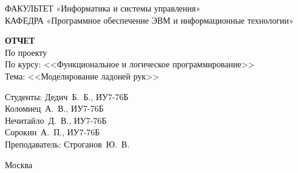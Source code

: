 \begin{titlepage}
	{\doublespacing \small \raggedright ФАКУЛЬТЕТ \hspace{25mm} «Информатика и системы управления»\\
	КАФЕДРА \hspace{5mm} «Программное обеспечение ЭВМ и информационные технологии»\\}

	\vspace{30mm}
	
	\textbf{ОТЧЕТ}\\
	По проекту\\
	По курсу: <<Функциональное и логическое программирование>>\\
	Тема: <<Моделирование ладоней рук>>\\

	\vspace{60mm}

	\hspace{70mm} Студенты:       \hfill Дедич~Б.~Б., ИУ7-76Б\\
	\hspace{70mm} \hfill Коломиец~А.~В., ИУ7-76Б\\
	\hspace{70mm} \hfill Нечитайло~Д.~В., ИУ7-76Б\\
	\hspace{70mm} \hfill Сорокин~А.~П., ИУ7-76Б\\
	\hspace{70mm} Преподаватель: \hfill Строганов~Ю.~В.\\

	\vfill
	
	Москва\\
	\the\year
\end{titlepage}

\setcounter{page}{2}